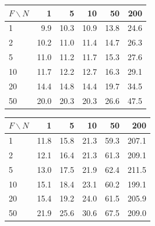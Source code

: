 \bigskip
\noindent\begin{minipage}{\textwidth}
  \centering
  \begin{minipage}[b]{0.48\textwidth}
    \centering
    {\captionsetup{textfont=sf}
    \label{tab:eval-t6}}
    \small
    \begin{tabular}{|l|r|r|r|r|r|}
      \hline
      $F\backslash N$ & 1 & 5 & 10 & 50 & 200 \\
      \hline
      1  & 9.9  & 10.3 & 10.9 & 13.8 & 24.6 \\
      \hline
      2  & 10.2 & 11.0 & 11.4 & 14.7 & 26.3 \\
      \hline
      5  & 11.0 & 11.2 & 11.7 & 15.3 & 27.6 \\
      \hline
      10 & 11.7 & 12.2 & 12.7 & 16.3 & 29.1 \\
      \hline
      20 & 14.4 & 14.8 & 14.4 & 19.7 & 34.5 \\
      \hline
      50 & 20.0 & 20.3 & 20.3 & 26.6 & 47.5 \\
      \hline
    \end{tabular}
  \end{minipage}\hfill
  \begin{minipage}[b]{0.48\textwidth}
    \centering
    {\captionsetup{textfont=sf}
    \label{tab:eval-t7}}
    \small
    \begin{tabular}{|l|r|r|r|r|r|}
      \hline
      $F\backslash N$ & 1 & 5 & 10 & 50 & 200 \\
      \hline
      1  & 11.8 & 15.8 & 21.3 & 59.3 & 207.1 \\
      \hline
      2  & 12.1 & 16.4 & 21.3 & 61.3 & 209.1 \\
      \hline
      5  & 13.0 & 17.5 & 21.9 & 62.4 & 211.5 \\
      \hline
      10 & 15.1 & 18.4 & 23.1 & 60.2 & 199.1 \\
      \hline
      20 & 15.4 & 19.2 & 24.0 & 61.5 & 205.9 \\
      \hline
      50 & 21.9 & 25.6 & 30.6 & 67.5 & 209.0 \\
      \hline
    \end{tabular}
  \end{minipage}
\end{minipage}


